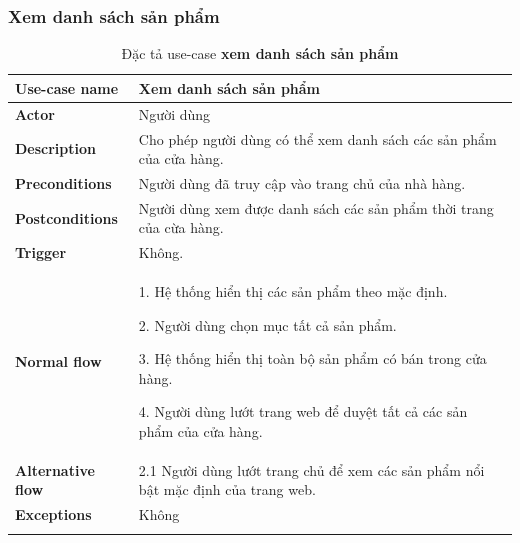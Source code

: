     \subsubsection{Xem danh sách sản phẩm} 
            \begin{center}
            
                \begin{longtable}{| p{} | p{} |} 
    \hline
    \textbf{Use-case name}
    & 
    Xem danh sách sản phẩm
    \\
    \hline
    \textbf{Actor} 
    & 
    Người dùng
    \\
    \hline
    \textbf{Description} 
    & 
    Cho phép người dùng có thể xem danh sách các sản phẩm của cửa hàng.
    \\
    \hline
     \textbf{Preconditions} 
    &
    Người dùng đã truy cập vào trang chủ của nhà hàng.
    \\
    \hline
    \textbf{Postconditions} 
    & 
    Người dùng xem được danh sách các sản phẩm thời trang của cừa hàng.
    \\
    \hline
    \textbf{Trigger} 
    & 
    Không.
    \\
    \hline
     \textbf{Normal flow}
    & 
        1. Hệ thống hiển thị các sản phẩm theo mặc định.
        
        2. Người dùng chọn mục tất cả sản phẩm.
        
        3. Hệ thống hiển thị toàn bộ sản phẩm có bán trong cửa hàng.
        
        4. Người dùng lướt trang web để duyệt tất cả các sản phẩm của cửa hàng.
    \\
    \hline
    \textbf{Alternative flow}
    & 
        2.1 Người dùng lướt trang chủ để xem các sản phẩm nổi bật mặc định của trang web.
    \\
    \hline
    \textbf{Exceptions} 
    &
    Không
    \\
    \hline
    \caption{Đặc tả use-case \textbf{xem danh sách sản phẩm}}
    \end{longtable}
                    
            \end{center}
